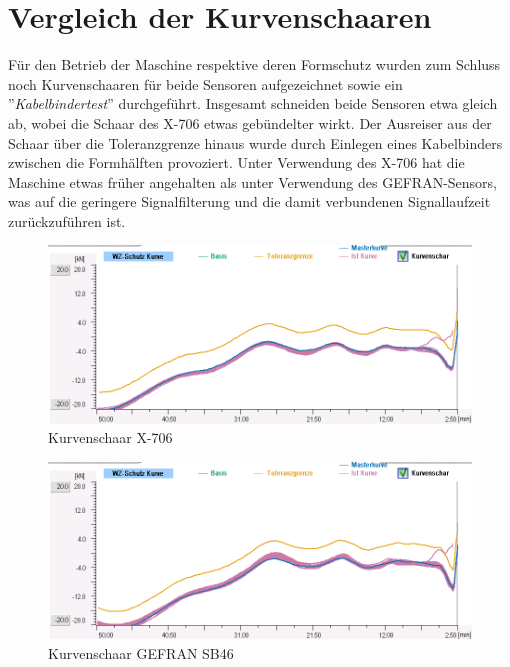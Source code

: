 \documentclass[12pt,a4paper]{article}
\begin{document}
\section{Vergleich der Kurvenschaaren}
Für den Betrieb der Maschine respektive deren Formschutz wurden zum Schluss noch Kurvenschaaren für beide Sensoren aufgezeichnet sowie ein ''\textit{Kabelbindertest}'' durchgeführt. Insgesamt schneiden beide Sensoren etwa gleich ab, wobei die Schaar des X-706 etwas gebündelter wirkt. Der Ausreiser aus der Schaar über die Toleranzgrenze hinaus wurde durch Einlegen eines Kabelbinders zwischen die Formhälften provoziert. Unter Verwendung des X-706 hat die Maschine etwas früher angehalten als unter Verwendung des GEFRAN-Sensors, was auf die geringere Signalfilterung und die damit verbundenen Signallaufzeit zurückzuführen ist.
\begin{figure}[H]
	\centering
	\includegraphics[width=1\linewidth]{imgs/Kurvenschaar_x-706}
	\caption{Kurvenschaar X-706}
	\label{fig:kurvenschaarx-706}
\end{figure}

\begin{figure}[H]
	\centering
	\includegraphics[width=1\linewidth]{imgs/Kurvenschaar_gefran}
	\caption{Kurvenschaar GEFRAN SB46}
	\label{fig:kurvenschaargefran}
\end{figure}
\end{document}
